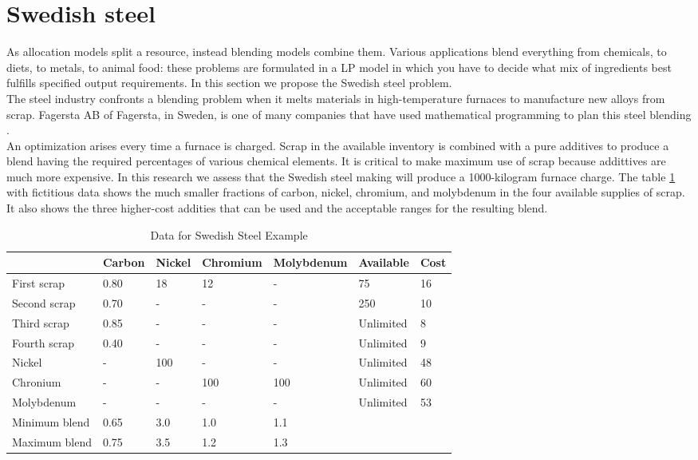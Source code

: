\documentclass[a4paper,10 pt,titlepage,twoside]{book}
\theoremstyle{plain}
\theoremstyle{definition}
\theoremstyle{remark}
\begin{document}
\section{Swedish steel}
As allocation models split a resource, instead blending models combine them. Various applications blend everything from chemicals, to diets, to metals, to animal food: these problems are formulated in a LP model in which you have to decide what mix of ingredients best fulfills specified output requirements. In this section we propose the Swedish steel problem.\\
The steel industry confronts a blending problem when it melts materials in high-temperature furnaces to manufacture new alloys from scrap. Fagersta AB of Fagersta, in Sweden, is one of many companies that have used mathematical programming to plan this steel blending \cite{SSM}.\\
An optimization arises every time a furnace is charged. Scrap in the available inventory is combined with a pure additives to produce a blend having the required percentages of various chemical elements. It is critical to make maximum use of scrap because addittives are much more expensive. In this research we assess that the Swedish steel making will produce a 1000-kilogram furnace charge. The table \ref{table:carbon} with fictitious data shows the much smaller fractions of carbon, nickel, chromium, and molybdenum in the four available supplies of scrap. It also shows the three higher-cost addities that can be used and the acceptable ranges for the resulting blend.\\
\begin{table}\caption{\label{table:carbon}Data for Swedish Steel Example}
\begin{center}
	\begin{tabular}{@{}lllllll@{}}
		\toprule
		& Carbon & Nickel & Chromium & Molybdenum & Available & Cost \\ \midrule
		First scrap   & 0.80   & 18     & 12       & -          & 75        & 16   \\
		Second scrap  & 0.70   & -      & -        & -          & 250       & 10   \\
		Third scrap   & 0.85   & -      & -        & -          & Unlimited & 8    \\
		Fourth scrap  & 0.40   & -      & -        & -          & Unlimited & 9    \\
		Nickel        & -      & 100    & -        & -          & Unlimited & 48   \\
		Chronium      & -      & -      & 100      & 100        & Unlimited & 60   \\
		Molybdenum    & -      & -      & -        & -          & Unlimited & 53   \\ \midrule
		Minimum blend & 0.65   & 3.0    & 1.0      & 1.1        &           &      \\ 
		Maximum blend & 0.75   & 3.5    & 1.2      & 1.3        &           &      \\ \midrule
	\end{tabular}
\end{center}
\end{table}
\end{document}
